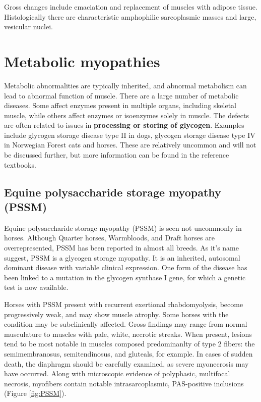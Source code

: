\documentclass[openany]{book}
\begin{document}
Gross changes include emaciation and replacement of muscles with adipose
tissue. Histologically there are characteristic amphophilic sarcoplasmic
masses and large, vesicular nuclei.

\section{Metabolic myopathies}\label{metabolic-myopathies}

Metabolic abnormalities are typically inherited, and abnormal metabolism
can lead to abnormal function of muscle. There are a large number of
metabolic diseases. Some affect enzymes present in multiple organs,
including skeletal muscle, while others affect enzymes or isoenzymes
solely in muscle. The defects are often related to issues in
\textbf{processing or storing of glycogen}. Examples include glycogen
storage disease type II in dogs, glycogen storage disease type IV in
Norwegian Forest cats and horses. These are relatively uncommon and will
not be discussed further, but more information can be found in the
reference textbooks.

\hypertarget{equine-polysaccharide-storage-myopathy-pssm}{\subsection{Equine
polysaccharide storage myopathy
(PSSM)}\label{equine-polysaccharide-storage-myopathy-pssm}}

Equine polysaccharide storage myopathy (PSSM) is seen not uncommonly in
horses. Although Quarter horses, Warmbloods, and Draft horses are
overrepresented, PSSM has been reported in almost all breeds. As it's
name suggest, PSSM is a glycogen storage myopathy. It is an inherited,
autosomal dominant disease with variable clinical expression. One form
of the disease has been linked to a mutation in the glycogen synthase I
gene, for which a genetic test is now available.

Horses with PSSM present with recurrent exertional rhabdomyolysis,
become progressively weak, and may show muscle atrophy. Some horses with
the condition may be subclinically affected. Gross findings may range
from normal musculature to muscles with pale, white, necrotic streaks.
When present, lesions tend to be most notable in muscles composed
predominanlty of type 2 fibers: the semimembranosus, semitendinosus, and
gluteals, for example. In cases of sudden death, the diaphragm should be
carefully examined, as severe myonecrosis may have occurred. Along with
microscopic evidence of polyphasic, multifocal necrosis, myofibers
contain notable intrasarcoplasmic, PAS-positive inclusions (Figure
\ref{fig:PSSM}).
\end{document}
